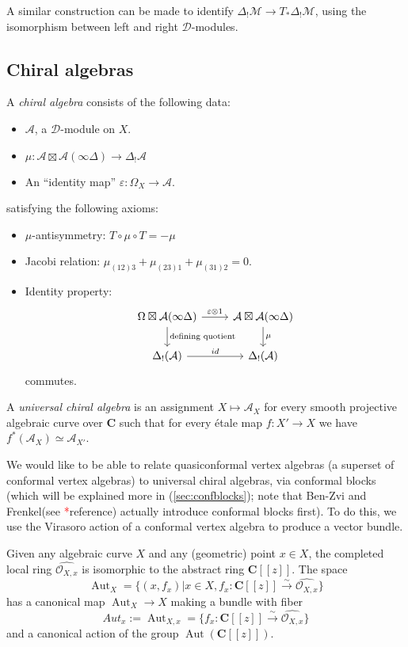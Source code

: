\documentclass{article}
\newcommand{\CC}{\mathbold{C}}
\newcommand{\Oo}{\mathcal{O}}
\newcommand{\Dd}{\mathcal{D}}
\newcommand{\Aa}{\mathcal{A}}
\newcommand{\Mm}{\mathcal{M}}
\newcommand{\tk}{\textcolor{red}{*}}
\DeclareMathOperator{\Aut}{Aut}
\begin{document}
A similar construction can be made to identify $\Delta_!\Mm \rightarrow T_*\Delta_!\Mm$, using the isomorphism between left and right $\Dd$-modules.
\subsection{Chiral algebras}
\label{sec:chiraldef}
A \textit{chiral algebra} consists of the following data:
\begin{itemize}
\item $\Aa$, a $\Dd$-module on $X$.
\item $\mu: \Aa \boxtimes \Aa (\infty \Delta) \rightarrow \Delta_! \Aa$
\item An ``identity map'' $\varepsilon: \Omega_X \rightarrow \Aa$.
\end{itemize}
satisfying the following axioms:
\begin{itemize}
\item $\mu$-antisymmetry: $T \circ \mu \circ T=-\mu$
\item Jacobi relation: $\mu_{(12)3}+\mu_{(23)1}+\mu_{(31)2}=0$.
\item Identity property:
\[
  \begin{tikzcd}
    \Omega \boxtimes \Aa (\infty \Delta) \arrow[r,"\varepsilon \otimes 1"] \arrow[d,"\textrm{defining quotient}"] & \Aa \boxtimes \Aa (\infty \Delta) \arrow[d,"\mu"]\\
    \Delta_!(\Aa) \arrow[r,"id"] & \Delta_!(\Aa)
  \end{tikzcd}
\]
commutes.
\end{itemize}
A \textit{universal chiral algebra} is an assignment $X \mapsto \Aa_X$ for every smooth projective algebraic curve over $\CC$ such that for every étale map $f: X' \rightarrow X$ we have $f^*(\Aa_X) \simeq \Aa_{X'}$.

We would like to be able to relate quasiconformal vertex algebras (a superset of conformal vertex algebras) to universal chiral algebras, via conformal blocks (which will be explained more in (\ref{sec:confblocks}); note that Ben-Zvi and Frenkel(see \tk reference) actually introduce conformal blocks first).  To do this, we use the Virasoro action of a conformal vertex algebra to produce a vector bundle.

Given any algebraic curve $X$ and any (geometric) point $x \in X$, the completed local ring $\widehat{\Oo_{X,x}}$ is isomorphic to the abstract ring $\CC[[z]]$.  The space
\[\Aut_X=\{(x,f_x)|x \in X, f_x: \CC[[z]] \overset{\sim}{\rightarrow} \widehat{\Oo_{X,x}} \} \]
has a canonical map $\Aut_X \rightarrow X$ making a bundle with fiber
\[Aut_x := \Aut_{X,x} = \{f_x: \CC[[z]] \overset{\sim}{\rightarrow} \widehat{\Oo_{X,x}} \} \]
and a canonical action of the group $\Aut(\CC[[z]])$.
\end{document}
